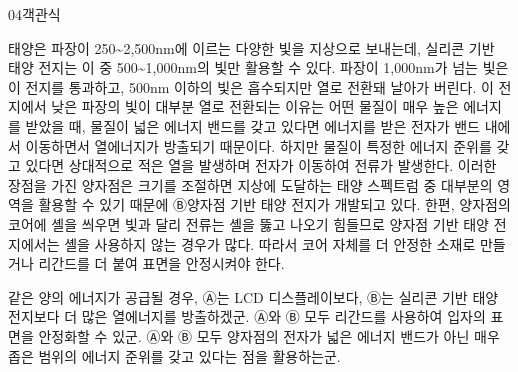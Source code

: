 \documentclass[fs85,seriesWit]{korfarm-base}
\begin{document}
\begin{kfQBlock}{04}{객관식}
\begin{kfEvidence}태양은 파장이 250\textasciitilde{}2,500nm에 이르는 다양한 빛을 지상으로 보내는데, 실리콘 기반 태양 전지는 이 중 500\textasciitilde{}1,000nm의 빛만 활용할 수 있다. 파장이 1,000nm가 넘는 빛은 이 전지를 통과하고, 500nm 이하의 빛은 흡수되지만 열로 전환돼 날아가 버린다. 이 전지에서 낮은 파장의 빛이 대부분 열로 전환되는 이유는 어떤 물질이 매우 높은 에너지를 받았을 때, 물질이 넓은 에너지 밴드를 갖고 있다면 에너지를 받은 전자가 밴드 내에서 이동하면서 열에너지가 방출되기 때문이다. 하지만 물질이 특정한 에너지 준위를 갖고 있다면 상대적으로 적은 열을 발생하며 전자가 이동하여 전류가 발생한다. 이러한 장점을 가진 양자점은 크기를 조절하면 지상에 도달하는 태양 스펙트럼 중 대부분의 영역을 활용할 수 있기 때문에 Ⓑ양자점 기반 태양 전지가 개발되고 있다. 한편, 양자점의 코어에 셸을 씌우면 빛과 달리 전류는 셸을 뚫고 나오기 힘들므로 양자점 기반 태양 전지에서는 셸을 사용하지 않는 경우가 많다. 따라서 코어 자체를 더 안정한 소재로 만들거나 리간드를 더 붙여 표면을 안정시켜야 한다.\end{kfEvidence}
\begin{kfChoices}
\kfChoice 같은 양의 에너지가 공급될 경우, Ⓐ는 LCD 디스플레이보다, Ⓑ는 실리콘 기반 태양 전지보다 더 많은 열에너지를 방출하겠군.
\kfChoice Ⓐ와 Ⓑ 모두 리간드를 사용하여 입자의 표면을 안정화할 수 있군.
\kfChoice Ⓐ와 Ⓑ 모두 양자점의 전자가 넓은 에너지 밴드가 아닌 매우 좁은 범위의 에너지 준위를 갖고 있다는 점을 활용하는군.
\end{kfChoices}
\end{kfQBlock}
\end{document}
